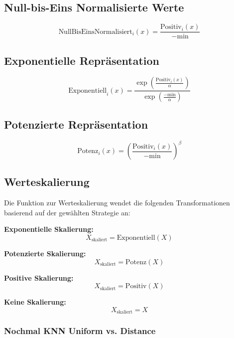 \subsection*{Null-bis-Eins Normalisierte Werte}
\begin{equation}
\text{NullBisEinsNormalisiert}_i(x) = \frac{\text{Positiv}_i(x)}{-\text{min}}
\end{equation}

\subsection*{Exponentielle Repräsentation}
\begin{equation}
\text{Exponentiell}_i(x) = \frac{\exp\left(\frac{\text{Positiv}_i(x)}{\alpha}\right)}{\exp\left(\frac{-\text{min}}{\alpha}\right)}
\end{equation}

\subsection*{Potenzierte Repräsentation}
\begin{equation}
\text{Potenz}_i(x) = \left(\frac{\text{Positiv}_i(x)}{-\text{min}}\right)^{\beta}
\end{equation}

\subsection*{Werteskalierung}
Die Funktion zur Werteskalierung wendet die folgenden Transformationen basierend auf der gewählten Strategie an:

\textbf{Exponentielle Skalierung:}
\begin{equation}
X_{\text{skaliert}} = \text{Exponentiell}(X)
\end{equation}

\textbf{Potenzierte Skalierung:}
\begin{equation}
X_{\text{skaliert}} = \text{Potenz}(X)
\end{equation}

\textbf{Positive Skalierung:}
\begin{equation}
X_{\text{skaliert}} = \text{Positiv}(X)
\end{equation}

\textbf{Keine Skalierung:}
\begin{equation}
X_{\text{skaliert}} = X
\end{equation}

\subsubsection{Nochmal KNN Uniform vs. Distance}

